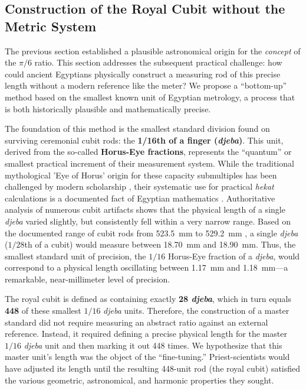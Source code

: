 \documentclass[11pt]{article}
\begin{document}
\subsection{Construction of the Royal Cubit without the Metric System}

The previous section established a plausible astronomical origin for the \textit{concept} of the $\pi/6$ ratio. This section addresses the subsequent practical challenge: how could ancient Egyptians physically construct a measuring rod of this precise length without a modern reference like the meter? We propose a ``bottom-up'' method based on the smallest known unit of Egyptian metrology, a process that is both historically plausible and mathematically precise.

The foundation of this method is the smallest standard division found on surviving ceremonial cubit rods: the \textbf{1/16th of a finger (\textit{djeba})}. This unit, derived from the so-called \textbf{Horus-Eye fractions}, represents the ``quantum'' or smallest practical increment of their measurement system. While the traditional mythological 'Eye of Horus' origin for these capacity submultiples has been challenged by modern scholarship \cite{ritter2002measure}, their systematic use for practical \textit{hekat} calculations is a documented fact of Egyptian mathematics \cite{clagett1999ancient}. Authoritative analysis of numerous cubit artifacts shows that the physical length of a single \textit{djeba} varied slightly, but consistently fell within a very narrow range. Based on the documented range of cubit rods from \SI{523.5}{\milli\meter} to \SI{529.2}{\milli\meter} \cite{lepsius1865altagyptische}, a single \textit{djeba} ($1/28$th of a cubit) would measure between \SI{18.70}{\milli\meter} and \SI{18.90}{\milli\meter}. Thus, the smallest standard unit of precision, the $1/16$ Horus-Eye fraction of a \textit{djeba}, would correspond to a physical length oscillating between \SI{1.17}{\milli\meter} and \SI{1.18}{\milli\meter}---a remarkable, near-millimeter level of precision.

The royal cubit is defined as containing exactly \textbf{28 \textit{djeba}}, which in turn equals \textbf{448} of these smallest $1/16$ \textit{djeba} units. Therefore, the construction of a master standard did not require measuring an abstract ratio against an external reference. Instead, it required defining a precise physical length for the master $1/16$ \textit{djeba} unit and then marking it out 448 times. We hypothesize that this master unit's length was the object of the ``fine-tuning.'' Priest-scientists would have adjusted its length until the resulting 448-unit rod (the royal cubit) satisfied the various geometric, astronomical, and harmonic properties they sought.
\end{document}
